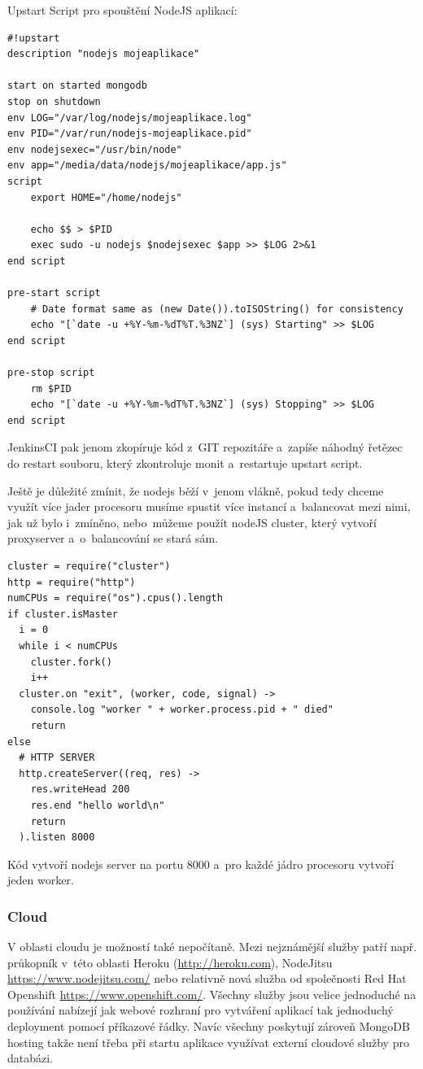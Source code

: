 \documentclass[a4paper,12pt,twoside,BCOR=10mm]{article}
\newenvironment{codeframe}{%
  \begin{Sbox} 
    \begin{minipage} 
      {\columnwidth-\leftmargin-\rightmargin-2\fboxsep-2\fboxrule-4pt} 
}{%

  \end{minipage} 
  \end{Sbox} 
  \begin{center} 
    \fcolorbox{black}{codeback}{\TheSbox} 
  \end{center} 
}
\begin{document}
Upstart Script pro spouštění NodeJS aplikací:
\begin{codeframe}
  \begin{verbatim}
#!upstart
description "nodejs mojeaplikace"

start on started mongodb
stop on shutdown
env LOG="/var/log/nodejs/mojeaplikace.log"
env PID="/var/run/nodejs-mojeaplikace.pid"
env nodejsexec="/usr/bin/node"
env app="/media/data/nodejs/mojeaplikace/app.js"
script
    export HOME="/home/nodejs"

    echo $$ > $PID
    exec sudo -u nodejs $nodejsexec $app >> $LOG 2>&1
end script

pre-start script
    # Date format same as (new Date()).toISOString() for consistency
    echo "[`date -u +%Y-%m-%dT%T.%3NZ`] (sys) Starting" >> $LOG
end script

pre-stop script
    rm $PID
    echo "[`date -u +%Y-%m-%dT%T.%3NZ`] (sys) Stopping" >> $LOG
end script
  \end{verbatim}
\end{codeframe}

JenkinsCI pak jenom zkopíruje kód z~GIT repozitáře a~zapíše náhodný řetězec do restart souboru, který zkontroluje monit a~restartuje upstart script.

Ještě je důležité zmínit, že nodejs běží v~jenom vlákně, pokud tedy chceme využít více jader procesoru musíme spustit více instancí a~balancovat mezi nimi, jak už bylo i~zmíněno, nebo~můžeme použít nodeJS cluster, který vytvoří proxyserver a~o~balancování se stará sám.\cite{prezNodeHuge}
\begin{codeframe}
  \begin{verbatim}
cluster = require("cluster")
http = require("http")
numCPUs = require("os").cpus().length
if cluster.isMaster
  i = 0
  while i < numCPUs
    cluster.fork()
    i++
  cluster.on "exit", (worker, code, signal) ->
    console.log "worker " + worker.process.pid + " died"
    return
else
  # HTTP SERVER
  http.createServer((req, res) ->
    res.writeHead 200
    res.end "hello world\n"
    return
  ).listen 8000
  \end{verbatim}
\end{codeframe}
Kód vytvoří nodejs server na portu 8000 a~pro každé jádro procesoru vytvoří jeden worker.\cite{prezNodeHuge}


\subsubsection{Cloud}
V oblasti cloudu je možností také nepočítaně. Mezi nejznámější služby patří např. průkopník v~této oblasti Heroku (\href{http://heroku.com}{http://heroku.com}), NodeJitsu \href{https://www.nodejitsu.com/}{https://www.nodejitsu.com/} nebo relativně nová služba od společnosti Red Hat Openshift \href{https://www.openshift.com/}{https://www.openshift.com/}. Všechny služby jsou velice jednoduché na používání nabízejí jak webové rozhraní pro vytváření aplikací tak jednoduchý deployment pomocí příkazové řádky. Navíc všechny poskytují zároveň MongoDB hosting takže není třeba při startu aplikace využívat externí cloudové služby pro databázi.\\
\end{document}
